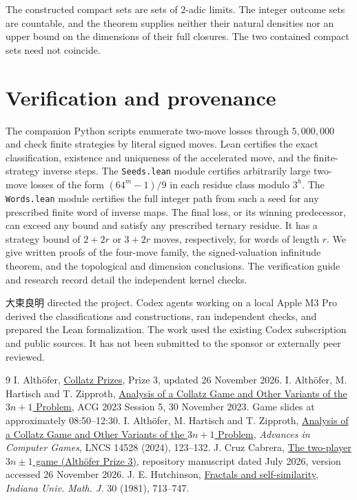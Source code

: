 \documentclass[11pt]{article}
\begin{document}
The constructed compact sets are sets of \(2\)-adic limits. The integer outcome sets are countable, and the theorem supplies neither their natural densities nor an upper bound on the dimensions of their full closures. The two contained compact sets need not coincide.

\section{Verification and provenance}

The companion Python scripts enumerate two-move losses through \(5{,}000{,}000\) and check finite strategies by literal signed moves. Lean certifies the exact classification, existence and uniqueness of the accelerated move, and the finite-strategy inverse steps. The \texttt{Seeds.lean} module certifies arbitrarily large two-move losses of the form \((64^m-1)/9\) in each residue class modulo \(3^h\). The \texttt{Words.lean} module certifies the full integer path from such a seed for any prescribed finite word of inverse maps. The final loss, or its winning predecessor, can exceed any bound and satisfy any prescribed ternary residue. It has a strategy bound of \(2+2r\) or \(3+2r\) moves, respectively, for words of length \(r\). We give written proofs of the four-move family, the signed-valuation infinitude theorem, and the topological and dimension conclusions. The verification guide and research record detail the independent kernel checks.

{\namefont 大束良明} directed the project. Codex agents working on a local Apple M3 Pro derived the classifications and constructions, ran independent checks, and prepared the Lean formalization. The work used the existing Codex subscription and public sources. It has not been submitted to the sponsor or externally peer reviewed.

\begin{thebibliography}{9}
 I. Althöfer, \href{https://althofer.de/collatz-prizes.html}{Collatz Prizes}, Prize 3, updated 26 November 2026.
 I. Althöfer, M. Hartisch and T. Zipproth, \href{https://www.youtube.com/watch?v=-BWhB0zFi7o&t=540s}{Analysis of a Collatz Game and Other Variants of the \(3n+1\) Problem}, ACG 2023 Session 5, 30 November 2023. Game slides at approximately 08:50--12:30.
 I. Althöfer, M. Hartisch and T. Zipproth, \href{https://doi.org/10.1007/978-3-031-54968-7_11}{Analysis of a Collatz Game and Other Variants of the \(3n+1\) Problem}, \emph{Advances in Computer Games}, LNCS 14528 (2024), 123--132.
 J. Cruz Cabrera, \href{https://github.com/joelcanary/collatz-kodama-observable/blob/a25878f82e9c75c6a14e6f6de05bc4f0fb7279a1/papers/althofer-prize3/paper.tex}{The two-player \(3n\pm1\) game (Althöfer Prize 3)}, repository manuscript dated July 2026, version accessed 26 November 2026.
 J. E. Hutchinson, \href{https://doi.org/10.1512/iumj.1981.30.30055}{Fractals and self-similarity}, \emph{Indiana Univ. Math. J.} 30 (1981), 713--747.
\end{thebibliography}
\end{document}
